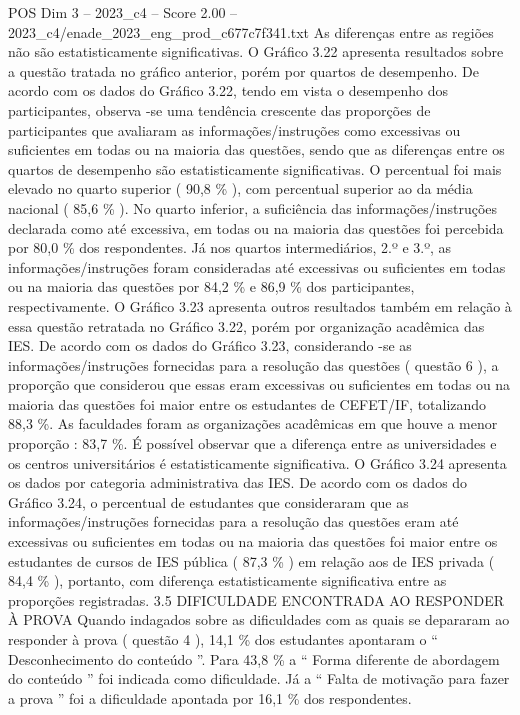 \begin{textsample}{POS Dim 3 – 2023\_c4 – Score 2.00 – 2023\_c4/enade\_2023\_eng\_prod\_c677c7f341.txt}
As diferenças entre as regiões não são estatisticamente significativas.
O Gráfico 3.22 apresenta resultados sobre a questão tratada no gráfico anterior, porém por quartos de desempenho.
De acordo com os dados do Gráfico 3.22, tendo em vista o desempenho dos participantes, observa -se uma tendência crescente das proporções de participantes que avaliaram as informações/instruções como excessivas ou suficientes em todas ou na maioria das questões, sendo que as diferenças entre os quartos de desempenho são estatisticamente significativas.
O percentual foi mais elevado no quarto superior ( 90,8 \% ), com percentual superior ao da média nacional ( 85,6 \% ).
No quarto inferior, a suficiência das informações/instruções declarada como até excessiva, em todas ou na maioria das questões foi percebida por 80,0 \% dos respondentes.
Já nos quartos intermediários, 2.º e 3.º, as informações/instruções foram consideradas até excessivas ou suficientes em todas ou na maioria das questões por 84,2 \% e 86,9 \% dos participantes, respectivamente.
O Gráfico 3.23 apresenta outros resultados também em relação à essa questão retratada no Gráfico 3.22, porém por organização acadêmica das IES.
De acordo com os dados do Gráfico 3.23, considerando -se as informações/instruções fornecidas para a resolução das questões ( questão 6 ), a proporção que considerou que essas eram excessivas ou suficientes em todas ou na maioria das questões foi maior entre os estudantes de CEFET/IF, totalizando 88,3 \%.
As faculdades foram as organizações acadêmicas em que houve a menor proporção : 83,7 \%.
É possível observar que a diferença entre as universidades e os centros universitários é estatisticamente significativa.
O Gráfico 3.24 apresenta os dados por categoria administrativa das IES.
De acordo com os dados do Gráfico 3.24, o percentual de estudantes que consideraram que as informações/instruções fornecidas para a resolução das questões eram até excessivas ou suficientes em todas ou na maioria das questões foi maior entre os estudantes de cursos de IES pública ( 87,3 \% ) em relação aos de IES privada ( 84,4 \% ), portanto, com diferença estatisticamente significativa entre as proporções registradas. 3.5 DIFICULDADE ENCONTRADA AO RESPONDER À PROVA Quando indagados sobre as dificuldades com as quais se depararam ao responder à prova ( questão 4 ), 14,1 \% dos estudantes apontaram o “ Desconhecimento do conteúdo ”.
Para 43,8 \% a “ Forma diferente de abordagem do conteúdo ” foi indicada como dificuldade.
Já a “ Falta de motivação para fazer a prova ” foi a dificuldade apontada por 16,1 \% dos respondentes.

\end{textsample}
